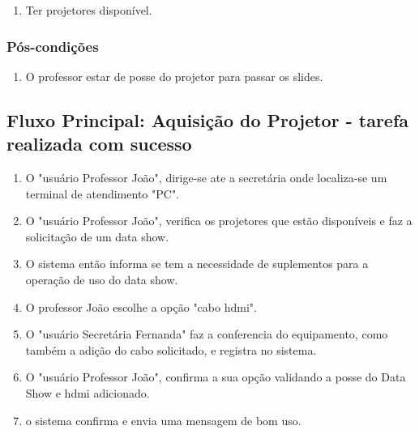 \begin{enumerate}

  \item Ter projetores disponível. 

\end{enumerate}


\subsubsection{Pós-condições}

\begin{enumerate}

  \item O professor estar de posse do projetor para passar os slides. 

\end{enumerate}


\subsection{Fluxo Principal: Aquisição do Projetor - tarefa realizada com sucesso}

\begin{enumerate}

  \item O "usuário Professor João", dirige-se ate a secretária onde localiza-se
    um terminal de atendimento "PC".

  \item O "usuário Professor João", verifica os projetores que estão disponíveis
    e faz a solicitação de um data show.

  \item O sistema então informa se tem a necessidade de suplementos para a
    operação de uso do data show. 
    
  \item O professor João escolhe a opção "cabo hdmi".

  \item O "usuário Secretária Fernanda" faz a conferencia do equipamento, como
    também a adição do cabo solicitado, e registra no sistema. 
  
  \item O "usuário Professor João", confirma a sua opção validando a posse do
    Data Show e hdmi adicionado. 

  \item o sistema confirma e envia uma mensagem de bom uso. 

\end{enumerate}

